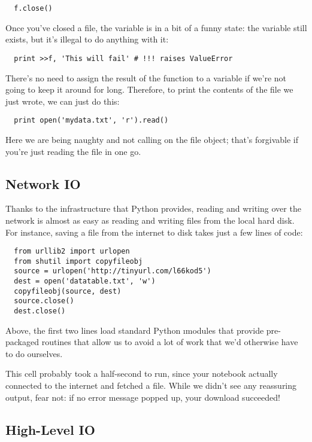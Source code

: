 \documentclass[letterpaper, 12pt, titlepage, twoside]{article}
\begin{document}
\begin{lstlisting}
  f.close()
\end{lstlisting}

Once you've closed a file, the  variable is in a bit of a funny state:
the variable still exists, but it's illegal to do anything with it:

\begin{lstlisting}
  print >>f, 'This will fail' # !!! raises ValueError
\end{lstlisting}

There's no need to assign the result of the  function to a variable
if we're not going to keep it around for long. Therefore, to print the
contents of the file we just wrote, we can just do this:

\begin{lstlisting}
  print open('mydata.txt', 'r').read()
\end{lstlisting}

Here we are being naughty and not calling  on the file object;
that's forgivable if you're just reading the file in one go.

\subsection*{Network IO}

Thanks to the infrastructure that Python provides, reading and writing over
the network is almost as easy as reading and writing files from the local hard
disk. For instance, saving a file from the internet to disk takes just a few
lines of code:

\begin{lstlisting}
  from urllib2 import urlopen
  from shutil import copyfileobj
  source = urlopen('http://tinyurl.com/l66kod5')
  dest = open('datatable.txt', 'w')
  copyfileobj(source, dest)
  source.close()
  dest.close()
\end{lstlisting}

Above, the first two lines load standard Python \i{modules} that provide
pre-packaged routines that allow us to avoid a lot of work that we'd otherwise
have to do ourselves.

This cell probably took a half-second to run, since your notebook actually
connected to the internet and fetched a file. While we didn't see any
reassuring output, fear not: if no error message popped up, your download
succeeded!

\subsection*{High-Level IO}
\end{document}
